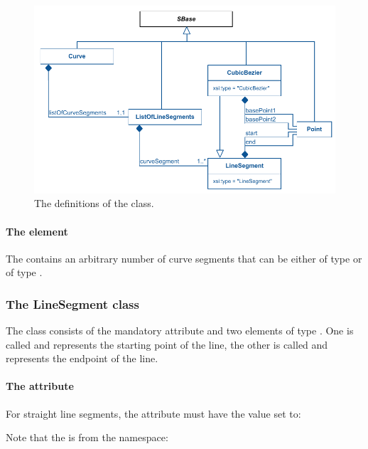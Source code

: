 \begin{figure}[ht]
\includegraphics{uml/layout-curve-uml}
\caption{The definitions of the \Curve class.}
\label{uml:curve}
\end{figure}

\paragraph{The  element} 
\label{listofcurvesegments-class} 

The  contains an arbitrary number of curve 
segments that can be either of type \LineSegment or of type 
\CubicBezier. 


\subsubsection{The LineSegment class} 
\label{linesegment-class} 

The \LineSegment class consists of the mandatory attribute 
 and two elements of type \Point. One is called 
 and represents the starting point of the line, the other 
is called  and represents the endpoint of the line. 

\paragraph {The  attribute} For straight line segments, 
the attribute  must have the value set to: 

\begin{center}
\end{center}

Note that the  is from the  namespace: 

